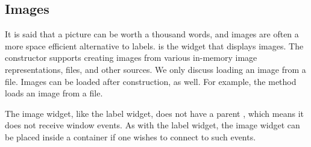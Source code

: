 \subsection{Images}
\label{sec:RGtk2:images}

It is said that a picture can be worth a thousand words, and images
are often a more space efficient alternative to
labels.  is the widget that displays images. The
constructor  supports creating images from
various in-memory image representations, files, and other sources.  We
only discuss loading an image from a file. Images can be loaded after
construction, as well. For example, the 
method loads an image from a file.

The image widget, like the label widget, does not have a parent
, which means it does not receive window events. As
with the label widget, the image widget can be placed inside a
 container if one wishes to connect to such
events.



